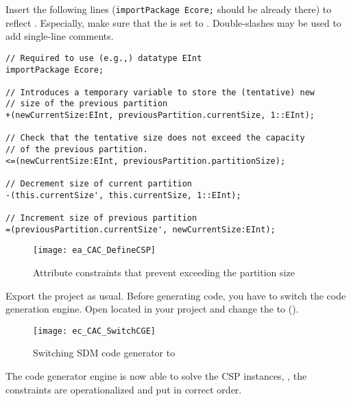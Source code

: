 \begin{stepbystep}
\item Insert the following lines (\texttt{importPackage Ecore;} should be already there) to reflect .
Especially, make sure that the  is set to .
Double-slashes may be used to add single-line comments.
\begin{verbatim}
// Required to use (e.g.,) datatype EInt
importPackage Ecore;

// Introduces a temporary variable to store the (tentative) new
// size of the previous partition
+(newCurrentSize:EInt, previousPartition.currentSize, 1::EInt);

// Check that the tentative size does not exceed the capacity
// of the previous partition.
<=(newCurrentSize:EInt, previousPartition.partitionSize);

// Decrement size of current partition
-(this.currentSize', this.currentSize, 1::EInt);

// Increment size of previous partition
=(previousPartition.currentSize', newCurrentSize:EInt);
\end{verbatim}
%
\begin{figure}[htbp]
    \begin{center}
        \texttt{[image: ea\_CAC\_DefineCSP]}
        \caption{Attribute constraints that prevent exceeding the partition size}  
        \label{ea:ea_CAC_DefineCSP}
    \end{center}
\end{figure}
% 
\item
Export the project as usual. 
Before generating code, you have to switch the code generation engine.
Open  located in your project and change the  to   ().

\begin{figure}[htbp]
\begin{center}
  \texttt{[image: ec\_CAC\_SwitchCGE]}
  \caption{Switching SDM code generator to }  
  \label{ec_CAC_SwitchCGE}
\end{center}
\end{figure}

\end{stepbystep}
The code generator engine is now able to solve the CSP instances, \idest, the constraints are operationalized and put in correct order. 
